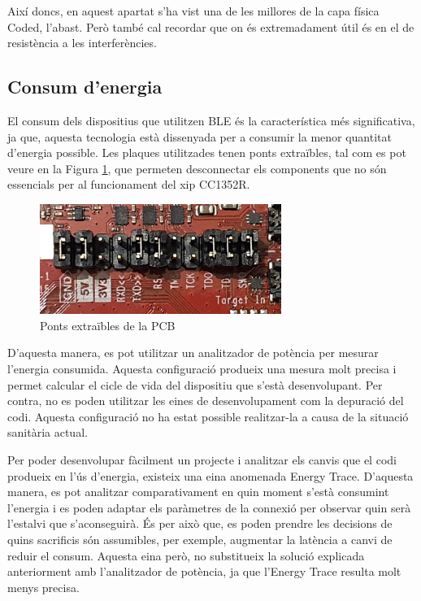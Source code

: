 Així doncs, en aquest apartat s'ha vist una de les millores de la capa física Coded, l'abast.
Però també cal recordar que on és extremadament útil és en el de resistència a les interferències.

\subsection{Consum d'energia}

El consum dels dispositius que utilitzen BLE és la característica més significativa, ja que, aquesta tecnologia està dissenyada per a consumir la menor quantitat d'energia possible.
Les plaques utilitzades tenen ponts extraïbles, tal com es pot veure en la Figura \ref{ponts_extraibles}, que permeten desconnectar els components que no són essencials per al funcionament del xip CC1352R.

\begin{figure}[h]
	\begin{center}
		\includegraphics[width=0.7\textwidth]{./images/ponts.jpg}
		\caption{Ponts extraïbles de la PCB}
		\label{ponts_extraibles}
	\end{center}
\end{figure}

D'aquesta manera, es pot utilitzar un analitzador de potència per mesurar l'energia consumida.
Aquesta configuració produeix una mesura molt precisa i permet calcular el cicle de vida del dispositiu que s'està desenvolupant.
Per contra, no es poden utilitzar les eines de desenvolupament com la depuració del codi.
Aquesta configuració no ha estat possible realitzar-la a causa de la situació sanitària actual.

Per poder desenvolupar fàcilment un projecte i analitzar els canvis que el codi produeix en l'ús d'energia, existeix una eina anomenada Energy Trace.
D'aquesta manera, es pot analitzar comparativament en quin moment s'està consumint l'energia i es poden adaptar els paràmetres de la connexió per observar quin serà l'estalvi que s'aconseguirà.
És per això que, es poden prendre les decisions de quins sacrificis són assumibles, per exemple, augmentar la latència a canvi de reduir el consum.
Aquesta eina però, no substitueix la solució explicada anteriorment amb l'analitzador de potència, ja que l'Energy Trace resulta molt menys precisa.

